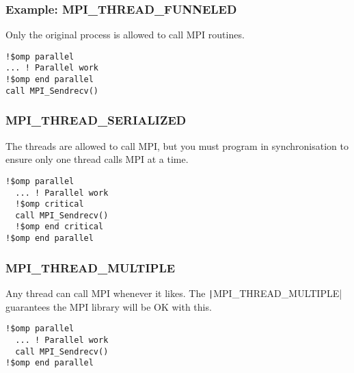 \documentclass{beamer}
\begin{document}
\begin{frame}[fragile]
\frametitle{Example: MPI\_THREAD\_FUNNELED}
Only the original process is allowed to call MPI routines.
\begin{verbatim}
!$omp parallel
... ! Parallel work
!$omp end parallel
call MPI_Sendrecv()
\end{verbatim}
\end{frame}

\begin{frame}[fragile]
\frametitle{MPI\_THREAD\_SERIALIZED}
The threads are allowed to call MPI, but you must program in synchronisation to ensure only one thread calls MPI at a time.
\begin{verbatim}
!$omp parallel
  ... ! Parallel work
  !$omp critical
  call MPI_Sendrecv()
  !$omp end critical
!$omp end parallel
\end{verbatim}
\end{frame}

\begin{frame}[fragile]
\frametitle{MPI\_THREAD\_MULTIPLE}
Any thread can call MPI whenever it likes. The \texttt|MPI_THREAD_MULTIPLE| guarantees the MPI library will be OK with this.
\begin{verbatim}
!$omp parallel
  ... ! Parallel work
  call MPI_Sendrecv()
!$omp end parallel
\end{verbatim}
\end{frame}

\end{document}
